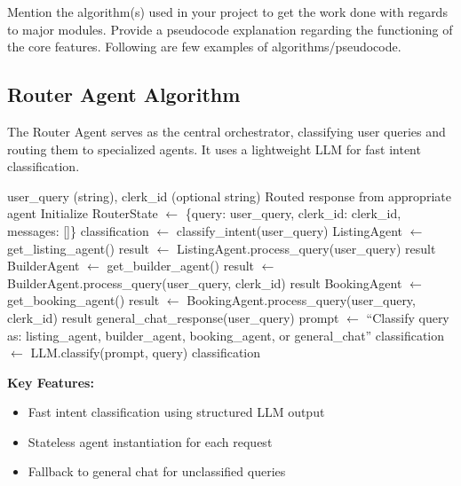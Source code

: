 Mention the algorithm(s) used in your project to get the work done with regards to major modules. Provide a pseudocode explanation regarding the functioning of the core features. Following are few examples of algorithms/pseudocode.

\subsection{Router Agent Algorithm}

The Router Agent serves as the central orchestrator, classifying user queries and routing them to specialized agents. It uses a lightweight LLM for fast intent classification.

\begin{algorithm}[H]
\caption{Router Agent Query Classification and Routing}
\label{alg:router}
\begin{algorithmic}[1]
\REQUIRE user\_query (string), clerk\_id (optional string)
\ENSURE Routed response from appropriate agent
\STATE Initialize RouterState $\leftarrow$ \{query: user\_query, clerk\_id: clerk\_id, messages: []\}
\STATE classification $\leftarrow$ classify\_intent(user\_query)
    \STATE ListingAgent $\leftarrow$ get\_listing\_agent()
    \STATE result $\leftarrow$ ListingAgent.process\_query(user\_query)
    \RETURN result
    \STATE BuilderAgent $\leftarrow$ get\_builder\_agent()
    \STATE result $\leftarrow$ BuilderAgent.process\_query(user\_query, clerk\_id)
    \RETURN result
    \STATE BookingAgent $\leftarrow$ get\_booking\_agent()
    \STATE result $\leftarrow$ BookingAgent.process\_query(user\_query, clerk\_id)
    \RETURN result
\ELSE
    \RETURN general\_chat\_response(user\_query)
\ENDIF
\STATE
{}
    \STATE prompt $\leftarrow$ ``Classify query as: listing\_agent, builder\_agent, booking\_agent, or general\_chat''
    \STATE classification $\leftarrow$ LLM.classify(prompt, query)
    \RETURN classification
\ENDFUNCTION
\end{algorithmic}
\end{algorithm}

\textbf{Key Features:}
\begin{itemize}
    \item Fast intent classification using structured LLM output
    \item Stateless agent instantiation for each request
    \item Fallback to general chat for unclassified queries
\end{itemize}

